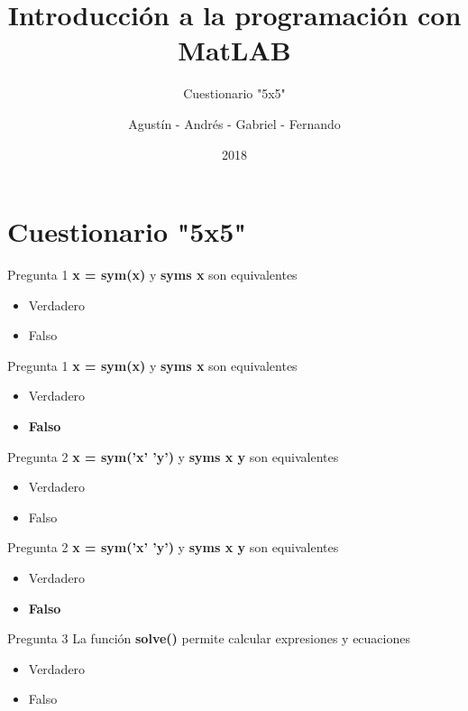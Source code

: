 \documentclass{bredelebeamer}
\title[Programación en MatLAB]{Introducción a la programación con MatLAB}
\subtitle{Cuestionario "5x5"}
\author{Agustín - Andrés - Gabriel - Fernando\inst{1}}
\institute[UTN.BA]
{
  \inst{1}%
  Universidad Tecnológica Nacional\\
  Facultad Regional Buenos Aires
  }
\date{2018}
\begin{document}
\begin{frame}
  \titlepage 
\end{frame}




\section{Cuestionario "5x5"}

\begin{frame}{Pregunta 1}
\textbf{x = sym(x)} y \textbf{syms x} son equivalentes
\begin{itemize}
\item Verdadero
\item Falso
\end{itemize}
\end{frame}

\begin{frame}{Pregunta 1}
\textbf{x = sym(x)} y \textbf{syms x} son equivalentes
\begin{itemize}
\item Verdadero
\item \textbf{Falso}
\end{itemize}
\end{frame}

\begin{frame}{Pregunta 2}
\textbf{x = sym('x' 'y')} y \textbf{syms x y} son equivalentes
\begin{itemize}
\item Verdadero
\item Falso
\end{itemize}
\end{frame}

\begin{frame}{Pregunta 2}
\textbf{x = sym('x' 'y')} y \textbf{syms x y} son equivalentes
\begin{itemize}
\item Verdadero
\item \textbf{Falso}
\end{itemize}
\end{frame}

\begin{frame}{Pregunta 3}
La función \textbf{solve()} permite calcular expresiones y ecuaciones
\begin{itemize}
\item Verdadero
\item Falso
\end{itemize}
\end{frame}
\end{document}
